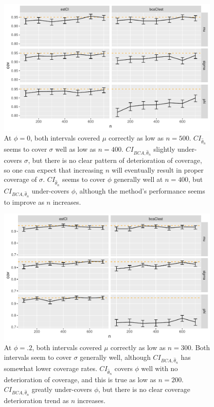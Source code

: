 \documentclass[12pt, letterpaper, titlepage]{article}
\begin{document}
\begin{figure}[tbp]
  \centering
  \includegraphics[width=\textwidth]{figures/plot_0}
  \caption{At $\phi = 0$, both intervals covered $\mu$ correctly as low as
    $n = 500$. $CI_{\hat{\theta}_{n}}$ seems to cover $\sigma$ well as low as 
    $n = 400$. $CI_{BCA, \hat{\theta}_{n}}$ slightly under-covers $\sigma$, but
    there is no clear pattern of deterioration of coverage, so one can expect
    that increasing $n$ will eventually result in proper coverage of $\sigma$.
    $CI_{\hat{\theta}_{n}}$ seems to cover $\phi$ generally well at $n = 400$,
    but $CI_{BCA, \hat{\theta}_{n}}$ under-covers $\phi$, although the
    method's performance seems to improve as $n$ increases.}
  \label{fig:plot_0}
\end{figure}


\begin{figure}[tbp]
  \centering
  \includegraphics[width=\textwidth]{figures/plot_.2}
  \caption{At $\phi = .2$, both intervals covered $\mu$ correctly as low as
    $n = 300$. Both intervals seem to cover $\sigma$ generally well, although
    $CI_{BCA, \hat{\theta}_{n}}$ has somewhat lower coverage rates.
    $CI_{\hat{\theta}_{n}}$ covers $\phi$ well with no deterioration of
    coverage, and this is true as low as $n = 200$.
    $CI_{BCA, \hat{\theta}_{n}}$ greatly under-covers $\phi$, but there is no
    clear coverage deterioration trend as $n$ increases.}
  \label{fig:plot_.2}
\end{figure}
\end{document}
